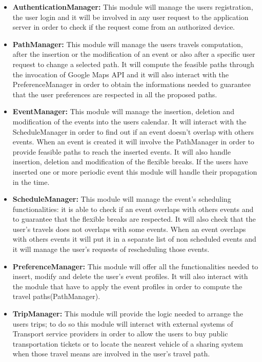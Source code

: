 \begin{itemize}
	\item \textbf{AuthenticationManager:} This module will manage the users registration, the user login and it will be involved in any user request to the application server in order to check if the request come from an authorized device.
	\item \textbf{PathManager:} This module will manage the users travels computation, after the insertion or the modification of an event or also after a specific user request to change a selected path. It will compute the feasible paths through the invocation of Google Maps API and it will also interact with the PreferenceManager in order to obtain the informations needed to guarantee that the user preferences are respected in all the proposed paths. 
	\item \textbf{EventManager:} This module will manage the insertion, deletion and modification of the events into the users calendar. It will interact with the ScheduleManager in order to find out if an event doesn't overlap with others events. When an event is created it will involve the PathManager in order to provide feasible paths to reach the inserted events. It will also handle insertion, deletion and modification of the flexible breaks.
	If the users have inserted one or more periodic event this module will handle their propagation in the time. 
	\item \textbf{ScheduleManager:} This module will manage the event's scheduling functionalities: it is able to check if an event overlaps with others events and to guarantee that the flexible breaks are respected. It will also check that the user's travels does not overlaps with some events. When an event overlaps with others events it will put it in a separate list of non scheduled events and it will manage the user's requests of rescheduling those events.
	\item \textbf{PreferenceManager:} This module will offer all the functionalities needed to insert, modify and delete the user's event profiles. It will also interact with the module that have to apply the event profiles in order to compute the travel paths(PathManager).
	\item \textbf{TripManager:} This module will provide the logic needed to arrange the users trips; to do so this module will interact with external systems of Transport service providers in order to allow the users to buy public transportation tickets or to locate the nearest vehicle of a sharing system when those travel means are involved in the user's travel path.

\end{itemize}
